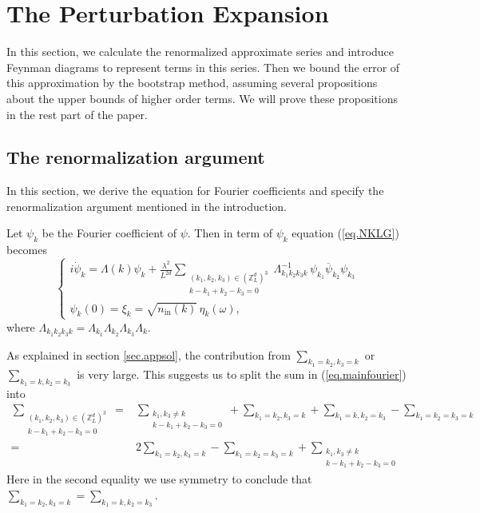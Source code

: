 \section{The Perturbation Expansion}
In this section, we calculate the renormalized approximate series and introduce Feynman diagrams to represent terms in this series. Then we bound the error of this approximation by the bootstrap method, assuming several propositions about the upper bounds of higher order terms. We will prove these propositions in the rest part of the paper.


\subsection{The renormalization argument} In this section, we derive the equation for Fourier coefficients and specify the renormalization argument mentioned in the introduction.

Let $\psi_k$ be the Fourier coefficient of $\psi$. Then in term of $\psi_k$ equation (\ref{eq.NKLG}) becomes
\begin{equation}\label{eq.mainfourier}
\begin{cases}
 i \dot{\psi}_{k} =  \Lambda(k) \psi_k
 +\frac{\lambda^2}{L^{2d}} \sum\limits_{\substack{(k_1,k_2,k_{3}) \in (\mathbb{Z}^d_L)^3 \\ k - k_1 + k_2 -k_3 = 0}} \Lambda_{k_1k_2k_3k}^{-1}\,\psi_{k_1}\overline{\psi}_{k_2}  \psi_{k_3}  \\[2em]
\psi_k(0) = \xi_k = \sqrt{n_{\textrm{in}}(k)} \, \eta_{k}(\omega),
\end{cases}
\end{equation}
where $\Lambda_{k_1k_2k_3k}=\Lambda_{k_1}\Lambda_{k_2}\Lambda_{k_3}\Lambda_{k}$.

As explained in section \ref{sec.appsol}, the contribution from $\sum_{k_1=k_2,k_3=k}$ or $\sum_{k_1=k,k_2=k_3}$ is very large. This suggests us to split the sum in (\ref{eq.mainfourier}) into
\begin{equation}
\begin{split}
\sum\limits_{\substack{(k_1,k_2,k_{3}) \in (\mathbb{Z}^d_L)^3 \\ k - k_1 + k_2 -k_3 = 0}}
=&\sum_{\substack{k_1, k_3\neq k\\ k - k_1 + k_2 -k_3 = 0}}+\sum_{k_1=k_2,k_3=k}+\sum_{k_1=k,k_2=k_3}-\sum_{k_1=k_2=k_3=k}
\\
=&2\sum_{k_1=k_2,k_3=k}-\sum_{k_1=k_2=k_3=k} +\sum_{\substack{k_1, k_3\neq k\\ k - k_1 + k_2 -k_3 = 0}} 
\end{split}
\end{equation}
Here in the second equality we use symmetry to conclude that $\sum_{k_1=k_2,k_3=k}=\sum_{k_1=k,k_2=k_3}$.

